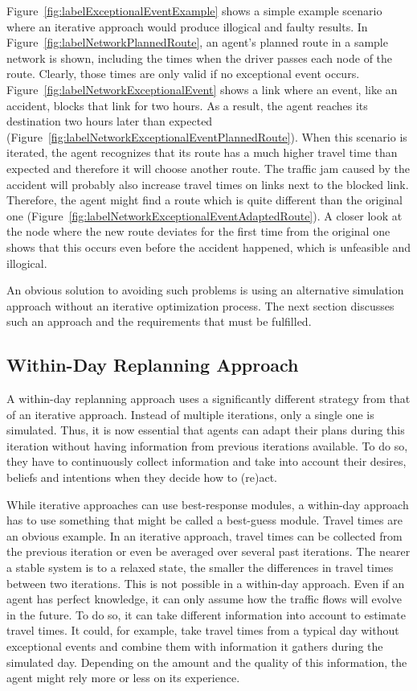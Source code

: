 Figure~\ref{fig:labelExceptionalEventExample} shows a simple example scenario where an iterative approach would produce illogical and faulty results. In Figure~\ref{fig:labelNetworkPlannedRoute}, an agent's planned route in a sample network is shown, including the times when the driver passes each node of the route. Clearly, those times are only valid if no exceptional event occurs. Figure~\ref{fig:labelNetworkExceptionalEvent} shows a link where an event, like an accident, blocks that link for two hours. As a result, the agent reaches its destination two hours later than expected (Figure~\ref{fig:labelNetworkExceptionalEventPlannedRoute}). When this scenario is iterated, the agent recognizes that its route has a much higher travel time than expected and therefore it will choose another route. The traffic jam caused by the accident will probably also increase travel times on links next to the blocked link. Therefore, the agent might find a route which is quite different than the original one (Figure~\ref{fig:labelNetworkExceptionalEventAdaptedRoute}). A closer look at the node where the new route deviates for the first time from the original one shows that this occurs even before the accident happened, which is unfeasible and illogical.

An obvious solution to avoiding such problems is using an alternative simulation approach without an iterative optimization process. The next section discusses such an approach and the requirements that must be fulfilled.

\subsection{Within-Day Replanning Approach}
A within-day replanning approach uses a significantly different strategy from that of an iterative approach. Instead of multiple iterations, only a single one is simulated. Thus, it is now essential that agents can adapt their plans during this iteration without having information from previous iterations available. To do so, they have to continuously collect information and take into account their desires, beliefs and intentions when they decide how to (re)act.

While iterative approaches can use best-response modules, a within-day approach has to use something that might be called a best-guess module. Travel times are an obvious example. In an iterative approach, travel times can be collected from the previous iteration or even be averaged over several past iterations. The nearer a stable system is to a relaxed state, the smaller the differences in travel times between two iterations. This is not possible in a within-day approach. Even if an agent has perfect knowledge, it can only assume how the traffic flows will evolve in the future. To do so, it can take different information into account to estimate travel times. It could, for example, take travel times from a typical day without exceptional events and combine them with information it gathers during the simulated day. Depending on the amount and the quality of this information, the agent might rely more or less on its experience.

